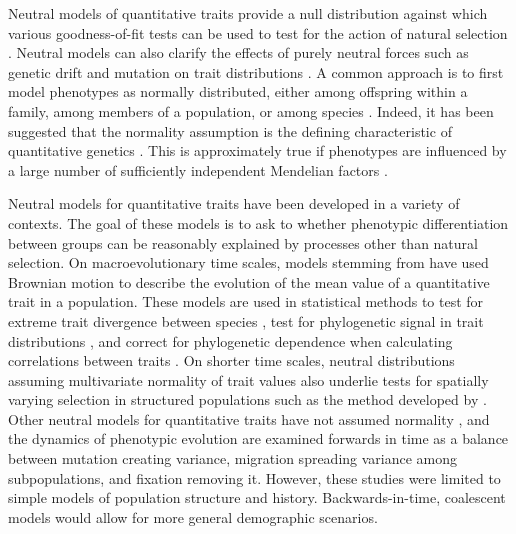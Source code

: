 Neutral models of quantitative traits provide a null distribution against which
various goodness-of-fit tests can be used to test for the action of natural
selection \citep{Lande1976,Leinonen2013}. Neutral models can also clarify the
effects of purely neutral forces such as genetic drift and mutation on trait
distributions \citep{Lynch1986}. A common approach is to first model phenotypes
as normally distributed, either among offspring within a family, among members
of a population, or among species \citep{Turelli2017}. Indeed, it has been
suggested that the normality assumption is the defining characteristic of
quantitative genetics \citep{Rice2004}. This is approximately true if phenotypes
are influenced by a large number of sufficiently independent Mendelian factors
\citep{Fisher1918}.

Neutral models for quantitative traits have been developed in a variety of
contexts. The goal of these models is to ask to whether phenotypic
differentiation between groups can be reasonably explained by processes other
than natural selection. On macroevolutionary time scales, models stemming
from \citet{Lande1976} have used Brownian motion to describe the evolution of
the mean value of a quantitative trait in a population. These models are used in
statistical methods to test for extreme trait divergence between
species \citep{Turelli1988}, test for phylogenetic signal in trait
distributions \citep{Freckleton2002}, and correct for phylogenetic dependence
when calculating correlations between traits \citep{Felsenstein1985}. On shorter
time scales, neutral distributions assuming multivariate normality of trait
values also underlie tests for spatially varying selection in structured
populations such as the method developed by \citet{Ovaskainen2011}. Other
neutral models for quantitative traits have not assumed
normality \citep{Chakraborty1982,Lynch1986,Lande1992}, and the dynamics of
phenotypic evolution are examined forwards in time as a balance between mutation
creating variance, migration spreading variance among subpopulations, and
fixation removing it. However, these studies were limited to simple models of
population structure and history. Backwards-in-time, coalescent models would
allow for more general demographic scenarios.

